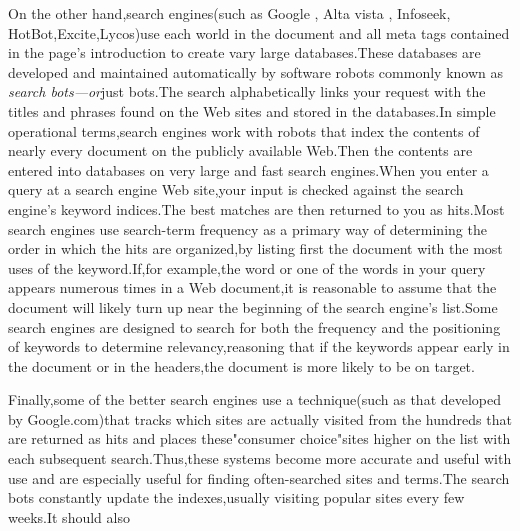 \documentclass[10pt,a4paper]{book}
\begin{document}
\small On the other hand,search engines(such as Google , Alta vista , Infoseek, HotBot,Excite,Lycos)use each world in the document and all meta tags contained in the page's introduction to create vary large databases.These databases are developed and maintained automatically by software robots commonly known as \emph{search bots---or}just bots.The search alphabetically links your request with the titles and phrases found on the Web sites and stored in the databases.In simple operational terms,search engines work with robots that index the contents of nearly every document on the publicly available Web.Then the contents are entered into databases on very large and fast search engines.When you enter a query at a search engine Web site,your input is checked against the search engine's keyword indices.The best matches are then returned to you as hits.Most search engines use search-term frequency as a primary way of determining the order in which the hits are organized,by listing first the document with the most uses of the keyword.If,for example,the word or one of the words in your query appears numerous times in a Web document,it is reasonable to assume that the document will likely turn up near the beginning of the search engine's list.Some search engines are designed to search for both the frequency and the positioning of keywords to determine relevancy,reasoning that if the keywords appear early in the document or in the headers,the document is more likely to be on target.

Finally,some of the better search engines use a technique(such as that developed by Google.com)that tracks which sites are actually visited from the hundreds that are returned as hits and places these"consumer choice"sites higher on the list with each subsequent search.Thus,these systems become more accurate and useful with use and are especially useful for finding often-searched sites and terms.The search bots constantly update the indexes,usually visiting popular sites every few weeks.It should also
\end{document}
